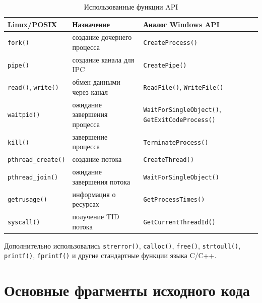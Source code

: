 \begin{table}[H]
    \centering
    \caption{Использованные функции API}
    \begin{tabularx}{\textwidth}{|p{4cm}|X|X|}
        \hline
        Linux/POSIX                       & Назначение                   & Аналог Windows API                                            \\
        \hline
        \texttt{fork()}                   & создание дочернего процесса  & \texttt{CreateProcess()}                                      \\
        \texttt{pipe()}                   & создание канала для IPC      & \texttt{CreatePipe()}                                         \\
        \texttt{read()}, \texttt{write()} & обмен данными через канал    & \texttt{ReadFile()}, \texttt{WriteFile()}                     \\
        \texttt{waitpid()}                & ожидание завершения процесса & \texttt{WaitForSingleObject()}, \texttt{GetExitCodeProcess()} \\
        \texttt{kill()}                   & завершение процесса          & \texttt{TerminateProcess()}                                   \\
        \texttt{pthread\_create()}        & создание потока              & \texttt{CreateThread()}                                       \\
        \texttt{pthread\_join()}          & ожидание завершения потока   & \texttt{WaitForSingleObject()}                                \\
        \texttt{getrusage()}              & информация о ресурсах        & \texttt{GetProcessTimes()}                                    \\
        \texttt{syscall()}                & получение TID потока         & \texttt{GetCurrentThreadId()}                                 \\
        \hline
    \end{tabularx}
\end{table}

Дополнительно использовались \texttt{strerror()}, \texttt{calloc()}, \texttt{free()},
\texttt{strtoull()}, \texttt{printf()}, \texttt{fprintf()} и другие стандартные
функции языка C/C++.

\newpage
\section{Основные фрагменты исходного кода}

